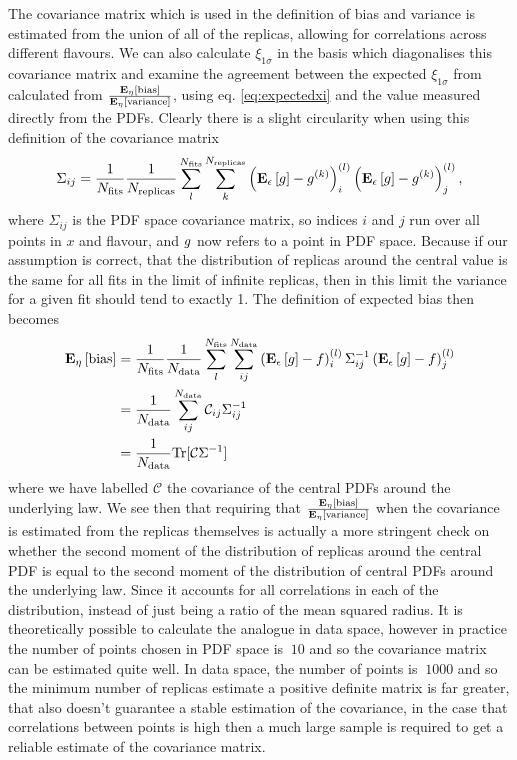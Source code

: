 The covariance matrix which is used in the definition of bias and variance is
estimated from the union of all of the replicas, allowing for correlations
across different flavours. We can also calculate $\xi_{1\sigma}$ in the basis
which diagonalises this covariance matrix and examine the
agreement between the expected $\xi_{1\sigma}$ from calculated from
$\frac{\mathbf{E}_{\eta}\left[ {\rm bias} \right]}{\mathbf{E}_{\eta}\left[ {\rm variance} \right]}$, using eq. \eqref{eq:expectedxi} and
the value measured directly from the PDFs. Clearly there is a slight circularity
when using this definition of the covariance matrix
\begin{equation}
    \Sigma_{ij} = \frac{1}{N_{\rm fits}}\frac{1}{N_{\rm replicas}} \sum_{l}^{N_{\rm fits}} \sum_{k}^{N_{\rm replicas}} \left( \mathbf{E}_{\epsilon}\left[ g \right] - g^{(k)}\right)^{(l)}_i \left( \mathbf{E}_{\epsilon}\left[ g \right] - g^{(k)}\right)^{(l)}_j ,
\end{equation}
where $\Sigma_{ij}$ is the PDF space covariance matrix, so indices $i$ and $j$
run over all points in $x$ and flavour, and $g$ now refers to a point in
PDF space. Because if our assumption is correct, that the distribution of
replicas around the central value is the same for all fits in the limit of infinite
replicas, then in this limit the variance for a given fit should tend to
exactly 1. The definition of expected bias then becomes
\begin{equation}
    \begin{split}
        \mathbf{E}_{\eta}\left[ {\rm bias} \right] &= \frac{1}{N_{\rm fits}} \frac{1}{N_{\rm data}} \sum^{N_{\rm fits}}_{l} \sum^{N_{\rm data}}_{ij}
    \left( \mathbf{E}_{\epsilon}\left[ g \right] - f \right)^{(l)}_{i} \Sigma^{-1}_{ij} \left( \mathbf{E}_{\epsilon}\left[ g \right] - f \right)^{(l)}_{j} \\
    &= \frac{1}{N_{\rm data}} \sum_{ij}^{N_{\rm data}} \mathcal{C}_{ij} \Sigma^{-1}_{ij} \\
    &= \frac{1}{N_{\rm data}} {\rm Tr}[\mathcal{C}\Sigma^{-1}]
    \end{split}
\end{equation}
where we have labelled $\mathcal{C}$ the covariance of the central PDFs around
the underlying law. We see then that requiring that $\frac{\mathbf{E}_{\eta}\left[ {\rm bias} \right]}{\mathbf{E}_{\eta}\left[ {\rm variance} \right]}$
when the covariance is estimated from the replicas themselves is actually
a more stringent check on whether the second moment of the distribution of
replicas around the central PDF is equal to the second moment of the distribution
of central PDFs around the underlying law. Since it accounts for all correlations
in each of the distribution, instead of just being a ratio of the mean squared
radius.
It is theoretically possible
to calculate the analogue in data space, however in practice the number of points
chosen in PDF space is $~10$ and so the covariance matrix can be estimated quite
well. In data space, the number of points is $~1000$ and so the minimum number
of replicas estimate a positive definite matrix is far greater, that also doesn't
guarantee a stable estimation of the covariance, in the case that correlations
between points is high then a much large sample is required to get a reliable
estimate of the covariance matrix.
